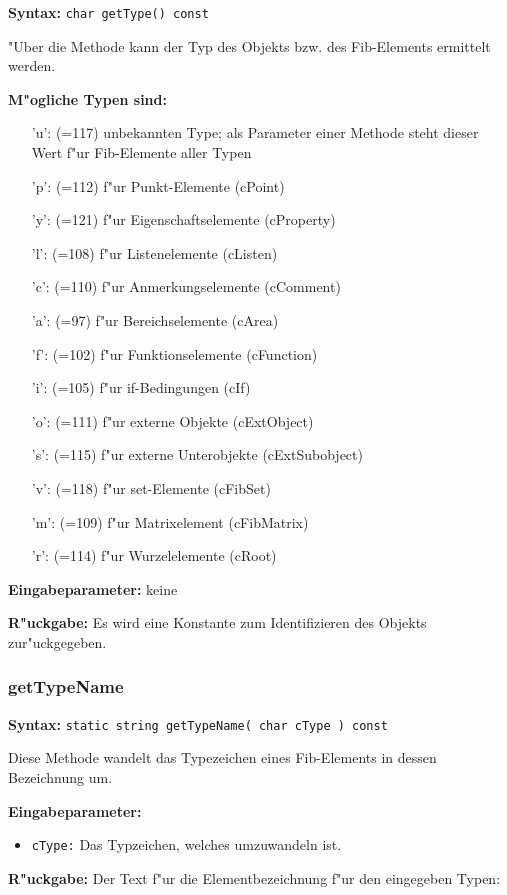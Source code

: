 \textbf{Syntax:} \verb|char getType() const|

\bigskip\noindent
"Uber die Methode kann der Typ des Objekts bzw. des Fib-Elements ermittelt werden.

\bigskip\noindent
\textbf{M"ogliche Typen sind:}
\begin{itemize}
 \item['u':] (=117) unbekannten Type; als Parameter einer Methode steht dieser Wert f"ur Fib-Elemente aller Typen
 \item['p':] (=112) f"ur Punkt-Elemente (cPoint)
 \item['y':] (=121) f"ur Eigenschaftselemente (cProperty)
 \item['l':] (=108) f"ur Listenelemente (cListen)
 \item['c':] (=110) f"ur Anmerkungselemente (cComment)
 \item['a':] (=97) f"ur Bereichselemente (cArea)
 \item['f':] (=102) f"ur Funktionselemente (cFunction)
 \item['i':] (=105) f"ur if-Bedingungen (cIf)
 \item['o':] (=111) f"ur externe Objekte (cExtObject)
 \item['s':] (=115) f"ur externe Unterobjekte (cExtSubobject)
 \item['v':] (=118) f"ur set-Elemente (cFibSet)
 \item['m':] (=109) f"ur Matrixelement (cFibMatrix)
 \item['r':] (=114) f"ur Wurzelelemente (cRoot)
\end{itemize}

\noindent
\textbf{Eingabeparameter:} keine

\bigskip\noindent
\textbf{R"uckgabe:} Es wird eine Konstante zum Identifizieren des Objekts zur"uckgegeben.


\subsubsection{getTypeName}

\textbf{Syntax:} \verb|static string getTypeName( char cType ) const|

\bigskip\noindent
Diese Methode wandelt das Typezeichen eines Fib-Elements in dessen Bezeichnung um.

\bigskip\noindent
\textbf{Eingabeparameter:}
\begin{itemize}
 \item \verb|cType:| Das Typzeichen, welches umzuwandeln ist.
\end{itemize}
\textbf{R"uckgabe:} Der Text f"ur die Elementbezeichnung f"ur den eingegeben Typen:

